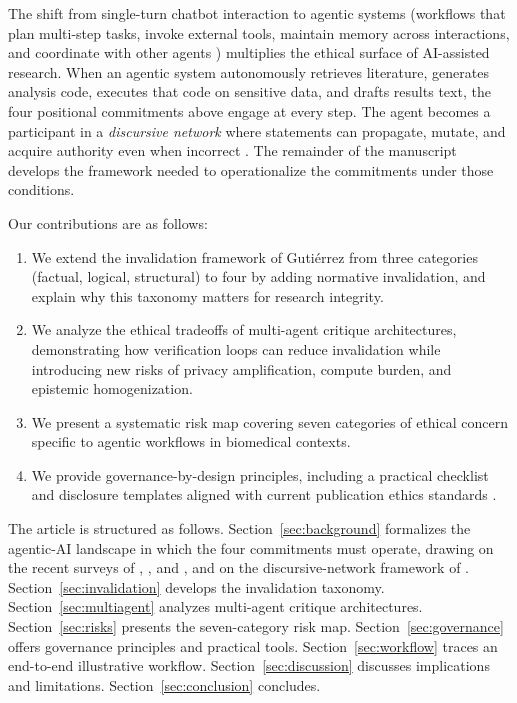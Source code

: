 \documentclass[11pt,letterpaper]{article}
\begin{document}
The shift from single-turn chatbot interaction to agentic systems
(workflows that plan multi-step tasks, invoke external tools, maintain
memory across interactions, and coordinate with other agents
\cite{thirunavukarasu2023,singhal2023,wang2024survey,xi2023rise})
multiplies the ethical surface of AI-assisted research. When an
agentic system autonomously retrieves literature, generates analysis
code, executes that code on sensitive data, and drafts results text,
the four positional commitments above engage at every step. The agent
becomes a participant in a \emph{discursive network} where statements
can propagate, mutate, and acquire authority even when incorrect
\cite{gutierrez2025}. The remainder of the manuscript develops the
framework needed to operationalize the commitments under those
conditions.

Our contributions are as follows:
\begin{enumerate}[leftmargin=*]
    \item We extend the invalidation framework of Guti\'errez \cite{gutierrez2025} from three categories (factual, logical, structural) to four by adding normative invalidation, and explain why this taxonomy matters for research integrity.

    \item We analyze the ethical tradeoffs of multi-agent critique architectures, demonstrating how verification loops can reduce invalidation while introducing new risks of privacy amplification, compute burden, and epistemic homogenization.

    \item We present a systematic risk map covering seven categories of ethical concern specific to agentic workflows in biomedical contexts.

    \item We provide governance-by-design principles, including a practical checklist and disclosure templates aligned with current publication ethics standards \cite{cope_ai,icmje_ai,wame2023}.
\end{enumerate}

The article is structured as follows. Section~\ref{sec:background}
formalizes the agentic-AI landscape in which the four commitments must
operate, drawing on the recent surveys of \cite{park2023},
\cite{wang2024survey}, and \cite{xi2023rise}, and on the discursive-network
framework of \cite{gutierrez2025}. Section~\ref{sec:invalidation}
develops the invalidation taxonomy. Section~\ref{sec:multiagent}
analyzes multi-agent critique architectures. Section~\ref{sec:risks}
presents the seven-category risk map. Section~\ref{sec:governance}
offers governance principles and practical tools.
Section~\ref{sec:workflow} traces an end-to-end illustrative workflow.
Section~\ref{sec:discussion} discusses implications and limitations.
Section~\ref{sec:conclusion} concludes.
\end{document}
